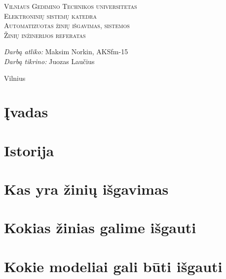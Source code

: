 \documentclass[12pt,a4paper]{article}
\begin{document}
\begin{titlepage}
  
  \begin{center}
    \textsc{\LARGE Vilniaus Gedimino Technikos universitetas}\\[2mm]
    \textsc{\Large Elektroninių sistemų katedra}\\[70mm]
    \textsc{\Large Automatizuotas žinių išgavimas, sistemos}\\[10mm]
    \textsc{\normalsize Žinių inžinerijos referatas}\\[40mm]
    \begin{minipage}{1\textwidth}
      \begin{flushright}
        \emph{Darbą atliko:} Maksim Norkin, AKSfm-15\\
        \emph{Darbą tikrino:} Juozas Laučius\\
      \end{flushright}
    \end{minipage}
    \vfill
    {\large Vilnius \\ \the\year}
  \end{center}
\end{titlepage}
\tableofcontents
\newpage

\section{Įvadas}



\section{Istorija}



\section{Kas yra žinių išgavimas}



\section{Kokias žinias galime išgauti}



\section{Kokie modeliai gali būti išgauti}
\end{document}
